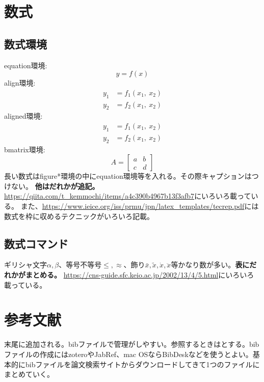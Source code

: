 \documentclass[uplatex,dvipdfmx,a4j,9pt,twocolumn,twoside]{jsarticle}
\begin{document}
\section{数式}

\subsection{数式環境}

equation環境:
\begin{equation}
    y = f(x)
\end{equation}
align環境:
\begin{align}
    y_1 &= f_1(x_1,~x_2) \\
    y_2 &= f_2(x_1,~x_2)
\end{align}
aligned環境:
\begin{equation}
    \begin{aligned}
        y_1 &= f_1(x_1,~x_2) \\
        y_2 &= f_2(x_1,~x_2)
    \end{aligned}
\end{equation}
bmatrix環境:
\begin{equation}
    A = 
    \begin{bmatrix}
        a & b \\
        c & d
    \end{bmatrix}
\end{equation}
長い数式はfigure*環境の中にequation環境等を入れる。その際キャプションはつけない。
\textbf{他はだれかが追記。}
\url{https://qiita.com/t_kemmochi/items/a4c390b4967b13f3afb7}にいろいろ載っている。
また、\url{https://www.ieice.org/iss/prmu/jpn/latex_templates/tecrep.pdf}には数式を枠に収めるテクニックがいろいろ記載。


\subsection{数式コマンド}
ギリシャ文字$\alpha,\beta$、等号不等号$\leq,\approx$、飾り$\bar{x},\tilde{x},\dot{x},\ddot{x}$等かなり数が多い。\textbf{表にだれかがまとめる。}
\url{https://cns-guide.sfc.keio.ac.jp/2002/13/4/5.html}にいろいろ載っている。

\section{参考文献}
末尾に追加される。bibファイルで管理がしやすい。参照するときは\cite{Fujiwara1984}とする。bibファイルの作成にはzoteroやJabRef、mac OSならBibDeskなどを使うとよい。基本的にbibファイルを論文検索サイトからダウンロードしてきて1つのファイルにまとめていく。
\end{document}
